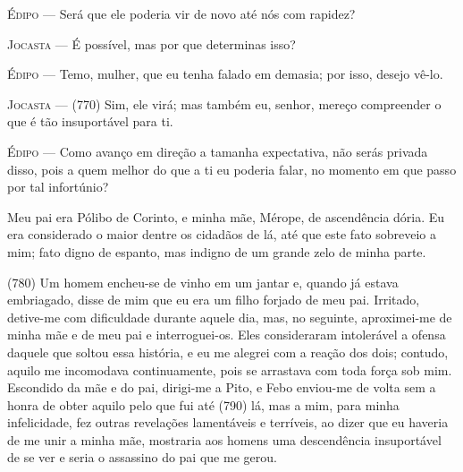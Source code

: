 \textsc{Édipo} --- Será que ele poderia vir de novo até nós com rapidez?

\textsc{Jocasta} --- É possível, mas por que determinas isso?

\textsc{Édipo} --- Temo, mulher, que eu tenha falado em demasia; por isso, desejo vê-lo.

\textsc{Jocasta} --- (770) Sim, ele virá; mas também eu, senhor, mereço compreender o que é
tão insuportável para ti.

\textsc{Édipo} --- Como avanço em direção a tamanha expectativa, não serás privada disso,
pois a quem melhor do que a ti eu poderia falar, no momento em que passo
por tal infortúnio?

Meu pai era Pólibo de Corinto, e minha mãe, Mérope, de ascendência
dória. Eu era considerado o maior dentre os cidadãos de lá, até que este
fato sobreveio a mim; fato digno de espanto, mas indigno de um grande
zelo de minha parte.

(780) Um homem encheu-se de vinho em um jantar e, quando já estava
embriagado, disse de mim que eu era um filho forjado de meu pai.
Irritado, detive-me com dificuldade durante aquele dia, mas, no
seguinte, aproximei-me de minha mãe e de meu pai e interroguei-os. Eles
consideraram intolerável a ofensa daquele que soltou essa história, e eu
me alegrei com a reação dos dois; contudo, aquilo me incomodava
continuamente, pois se arrastava com toda força sob mim. Escondido da
mãe e do pai, dirigi-me a Pito, e Febo enviou-me de volta sem a honra de
obter aquilo pelo que fui até (790) lá, mas a mim, para minha
infelicidade, fez outras revelações lamentáveis e terríveis, ao dizer
que eu haveria de me unir a minha mãe, mostraria aos homens uma
descendência insuportável de se ver e seria o assassino do pai que me
gerou.


